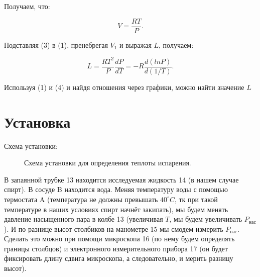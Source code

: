\documentclass[a4paper]{article}
\begin{document}
Получаем, что:

\begin{equation}
	V = \frac{RT}{P}.
\end{equation}

Подставляя (3) в (1), пренебрегая $V_1$ и выражая $L$, получаем:

\begin{equation}
	L = \frac{RT^2}{P} \frac{dP}{dT} = -R \frac{d(ln P)}{d(1/T)}.
\end{equation}

Используя (1) и (4) и найдя отношения через графики, можно найти значение $L$

\section{Установка}

Схема установки:

\begin{figure}[ht]
        \caption{Схема установки для определения теплоты испарения.}
        \label{ustanovka}
    \end{figure}

В запаянной трубке 13 находится исследуемая жидкость 14 (в нашем случае спирт). В сосуде B находится вода. Меняя температуру воды с помощью термостата A (температура не должны превышать $40 ^\circ C$, тк при такой температуре в наших условиях спирт начнёт закипать), мы будем менять давление насыщенного пара в колбе 13 (увеличивая $T$, мы будем увеличивать $P_\text{нас}$). И по разнице высот столбиков на манометре 15 мы смодем измерить $P_\text{нас}$. Сделать это можно при помощи микроскопа 16 (по нему будем определять границы столбцов) и электронного измерительного прибора 17 (он будет фиксировать длину сдвига микроскопа, а следовательно, и мерить разницу высот).
\end{document}

